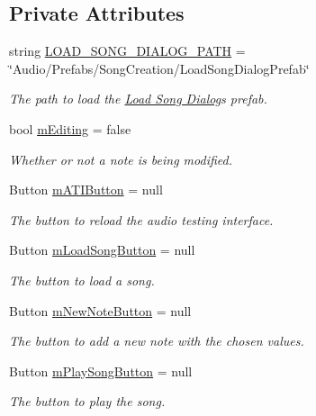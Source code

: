 \subsection*{Private Attributes}
\begin{DoxyCompactItemize}
\item 
string \hyperlink{group___s_c_m_const_ga821945ef78c5b9411d7861b42407591e}{L\+O\+A\+D\+\_\+\+S\+O\+N\+G\+\_\+\+D\+I\+A\+L\+O\+G\+\_\+\+P\+A\+TH} = \char`\"{}Audio/Prefabs/Song\+Creation/Load\+Song\+Dialog\+Prefab\char`\"{}
\begin{DoxyCompactList}\small\item\em The path to load the \hyperlink{group___doc_s_c___l_s_d}{Load Song Dialog}\textquotesingle{}s prefab. \end{DoxyCompactList}\item 
bool \hyperlink{group___s_c_m_priv_var_gad2a61787c63fb8770d3c8100adfae9cf}{m\+Editing} = false
\begin{DoxyCompactList}\small\item\em Whether or not a note is being modified. \end{DoxyCompactList}\item 
Button \hyperlink{group___s_c_m_priv_var_gae702ec5de2c75149b8c650db9ac260a6}{m\+A\+T\+I\+Button} = null
\begin{DoxyCompactList}\small\item\em The button to reload the audio testing interface. \end{DoxyCompactList}\item 
Button \hyperlink{group___s_c_m_priv_var_ga7851ecd194d87e14fa186fc76e154222}{m\+Load\+Song\+Button} = null
\begin{DoxyCompactList}\small\item\em The button to load a song. \end{DoxyCompactList}\item 
Button \hyperlink{group___s_c_m_priv_var_gac17f83788e480bb97160d17bbe69aab3}{m\+New\+Note\+Button} = null
\begin{DoxyCompactList}\small\item\em The button to add a new note with the chosen values. \end{DoxyCompactList}\item 
Button \hyperlink{group___s_c_m_priv_var_ga4ba18826907a0efbeb2ad62444124657}{m\+Play\+Song\+Button} = null
\begin{DoxyCompactList}\small\item\em The button to play the song. \end{DoxyCompactList}\item 

\end{DoxyCompactItemize}
